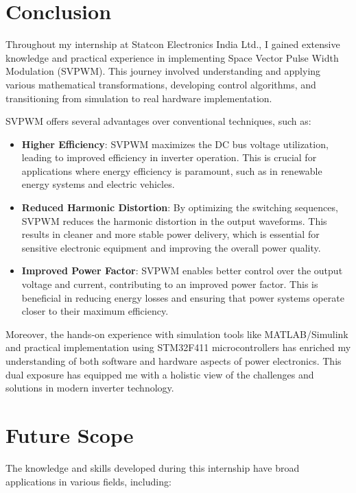 \section{Conclusion}
Throughout my internship at Statcon Electronics India Ltd., I gained extensive
knowledge and practical experience in implementing Space Vector Pulse Width
Modulation (SVPWM). This journey involved understanding and applying various
mathematical transformations, developing control algorithms, and transitioning
from simulation to real hardware implementation.

\noindent
SVPWM offers several advantages over conventional techniques, such as:
\begin{itemize}
    \item \textbf{Higher Efficiency}: SVPWM maximizes the DC bus voltage utilization, leading to improved efficiency in inverter operation. This is crucial for applications where energy efficiency is paramount, such as in renewable energy systems and electric vehicles.
    \item \textbf{Reduced Harmonic Distortion}: By optimizing the switching sequences, SVPWM reduces the harmonic distortion in the output waveforms. This results in cleaner and more stable power delivery, which is essential for sensitive electronic equipment and improving the overall power quality.
    \item \textbf{Improved Power Factor}: SVPWM enables better control over the output voltage and current, contributing to an improved power factor. This is beneficial in reducing energy losses and ensuring that power systems operate closer to their maximum efficiency.
\end{itemize}

\noindent
Moreover, the hands-on experience with simulation tools like MATLAB/Simulink
and practical implementation using STM32F411 microcontrollers has enriched my
understanding of both software and hardware aspects of power electronics. This
dual exposure has equipped me with a holistic view of the challenges and
solutions in modern inverter technology.

\section{Future Scope}
The knowledge and skills developed during this internship have broad
applications in various fields, including:


